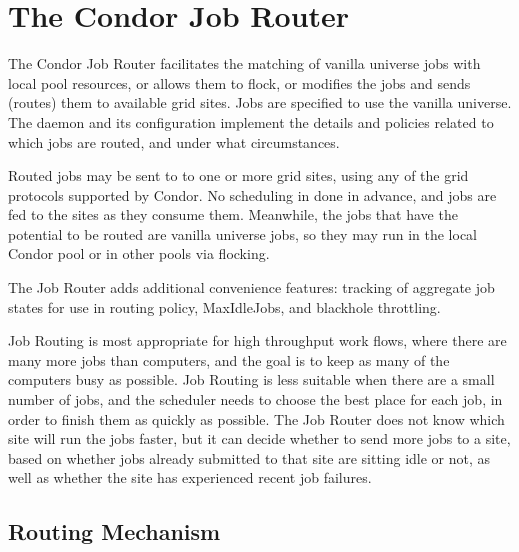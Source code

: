 \section{\label{sec:JobRouter}The Condor Job Router}

The Condor Job Router facilitates the matching of vanilla universe jobs
with local pool resources, or allows them to flock,
or modifies the jobs and sends (routes) them to available grid sites. 
Jobs are specified to use the vanilla universe.
The  daemon and its configuration 
implement the details and policies related to which jobs are routed,
and under what circumstances.

Routed jobs may be sent to to one or more grid sites,
using any of the grid protocols supported by Condor.
No scheduling in done in advance, and jobs are fed to the
sites as they consume them.
Meanwhile, the jobs that have the potential to be routed
are vanilla universe jobs, so they may run in the local
Condor pool or in other pools via flocking.

The Job Router adds additional convenience features:
tracking of aggregate job states for use in routing policy,
MaxIdleJobs,
and blackhole throttling.

Job Routing is most appropriate for high throughput work flows, 
where there are many more jobs than computers,
and the goal is to keep as many of the computers busy as possible.
Job Routing is less suitable when there are a small number of jobs,
and the scheduler needs to choose the best place for each job,
in order to finish them as quickly as possible.
The Job Router does not know which site will run the jobs faster,
but it can decide whether to send more jobs to a site,
based on whether jobs already submitted to that site are
sitting idle or not, 
as well as whether the site has experienced recent job failures.

\subsection{\label{sec:RouterMechanism}Routing Mechanism}

